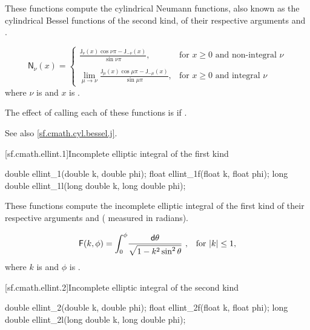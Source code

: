 \begin{itemdescr}

\pnum
\effects
These functions compute the cylindrical Neumann functions,
also known as the cylindrical Bessel functions of the second kind,
of their respective arguments
 and .

\pnum
\returns
\[%
  \mathsf{N}_\nu(x) =
  \left\{
  \begin{array}{cl}
  \displaystyle
  \frac{\mathsf{J}_\nu(x) \cos \nu\pi - \mathsf{J}_{-\nu}(x)}
       {\sin \nu\pi },
  & \mbox{for $x \ge 0$ and non-integral $\nu$}
  \\
  \\
  \displaystyle
  \lim_{\mu \rightarrow \nu} \frac{\mathsf{J}_\mu(x) \cos \mu\pi - \mathsf{J}_{-\mu}(x)}
                                {\sin \mu\pi },
  & \mbox{for $x \ge 0$ and integral $\nu$}
  \end{array}
  \right.
\]
where
$\nu$ is  and
$x$ is .

\pnum
\remarks
The effect of calling each of these functions
is 
if .

\pnum
See also \ref{sf.cmath.cyl.bessel.j}.
\end{itemdescr}

[sf.cmath.ellint.1]{Incomplete elliptic integral of the first kind}%
%
%
%
%
%
\begin{itemdecl}
double       ellint_1(double k, double phi);
float        ellint_1f(float k, float phi);
long double  ellint_1l(long double k, long double phi);
\end{itemdecl}

\begin{itemdescr}
\pnum
\effects
These functions compute
the incomplete elliptic integral of the first kind
of their respective arguments
 and  ( measured in radians).

\pnum
\returns
\[ \mathsf{F}(k, \phi) =
     \int_0^\phi \! \frac{\mathsf{d}\theta}{\sqrt{1 - k^2 \sin^2 \theta}}
     \text{ ,\quad for $|k| \le 1$,} \]
where
$k$ is  and
$\phi$ is .
\end{itemdescr}

[sf.cmath.ellint.2]{Incomplete elliptic integral of the second kind}%
%
%
%
%
%
\begin{itemdecl}
double       ellint_2(double k, double phi);
float        ellint_2f(float k, float phi);
long double  ellint_2l(long double k, long double phi);
\end{itemdecl}

